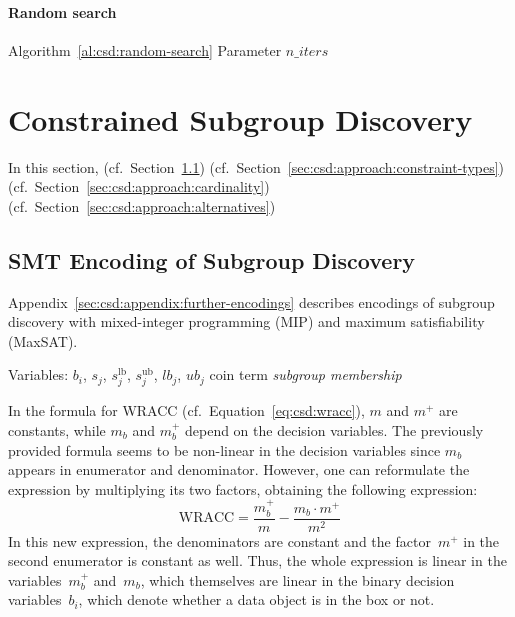 \documentclass{article}
\theoremstyle{definition}
\begin{document}
\paragraph{Random search}

Algorithm~\ref{al:csd:random-search}
Parameter $n\_iters$

\section{Constrained Subgroup Discovery}
\label{sec:csd:approach}

In this section, (cf.~Section~\ref{sec:csd:approach:smt}) (cf.~Section~\ref{sec:csd:approach:constraint-types}) (cf.~Section~\ref{sec:csd:approach:cardinality}) (cf.~Section~\ref{sec:csd:approach:alternatives})

\subsection{SMT Encoding of Subgroup Discovery}
\label{sec:csd:approach:smt}

Appendix~\ref{sec:csd:appendix:further-encodings} describes encodings of subgroup discovery with mixed-integer programming (MIP) and maximum satisfiability (MaxSAT).

Variables: $b_i$, $s_j$, $s_j^{\text{lb}}$, $s_j^{\text{ub}}$, $lb_j$, $ub_j$
coin term \emph{subgroup membership}

In the formula for WRACC (cf.~Equation~\ref{eq:csd:wracc}), $m$ and $m^+$ are constants, while $m_b$ and $m_b^+$ depend on the decision variables.
The previously provided formula seems to be non-linear in the decision variables since $m_b$ appears in enumerator and denominator.
However, one can reformulate the expression by multiplying its two factors, obtaining the following expression:
%
\begin{equation}
	\text{WRACC} = \frac{m_b^+}{m} - \frac{m_b \cdot m^+}{m^2}
	\label{eq:csd:wracc-rearranged}
\end{equation}
%
In this new expression, the denominators are constant and the factor~$m^+$ in the second enumerator is constant as well.
Thus, the whole expression is linear in the variables~$m_b^+$ and~$m_b$, which themselves are linear in the binary decision variables~$b_i$, which denote whether a data object is in the box or not.

\begin{equation}
	\label{eq:csd:smt-unconstrained-complete}
\end{equation}
\end{document}
